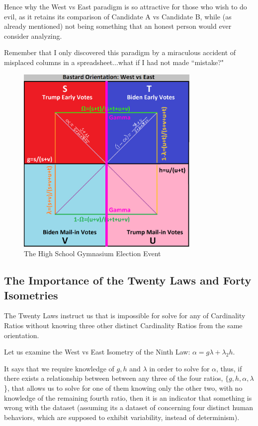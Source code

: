 \documentclass[preprint,13pt]{elsarticle}
\begin{document}
Hence why the West vs East paradigm is so attractive for those who wish to do evil, as it retains its comparison of Candidate A vs Candidate B, while (as already mentioned) not being something that an honest person would ever consider analyzing.

Remember that I only discovered this paradigm by a miraculous accident of misplaced columns in a spreadsheet...what if I had not made ``mistake?"
\begin{figure}[bp!]
\begin{center}
\caption{The High School Gymnasium Election Event}
\includegraphics[width=250pt]{West vs East.png}
\end{center}
\end{figure}
\newpage
\subsection{The Importance of the Twenty Laws and Forty Isometries}

The Twenty Laws instruct us that is impossible for solve for any of Cardinality Ratios without knowing three other distinct Cardinality Ratios from the same orientation.

Let us examine the West vs East Isometry of the Ninth Law: $\alpha=g\lambda+\lambda_{2}h$.

It says that we require knowledge of $g,h$ and $\lambda$ in order to solve for $\alpha$, thus, if there exists a relationship between between any three of the four ratios, $\{g,h,\alpha,\lambda$\}, that allows us to solve for one of them knowing only the other two, with no knowledge of the remaining fourth ratio, then it is an indicator that something is wrong with the dataset (assuming its a dataset of concerning four distinct human behaviors, which are supposed to exhibit variability, instead of determinism).
\end{document}
